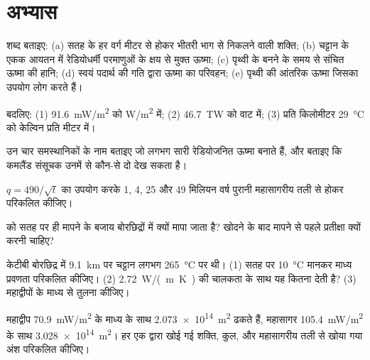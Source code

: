 \section{अभ्यास}

\begin{exercise}[$\star$]\label{exo:g12:internal-heat:1}
शब्द बताइए: (a) सतह के हर वर्ग मीटर से होकर भीतरी भाग से निकलने वाली
शक्ति; (b) चट्टान के एकक आयतन में रेडियोधर्मी परमाणुओं के क्षय से मुक्त
ऊष्मा; (c) पृथ्वी के बनने के समय से संचित ऊष्मा की हानि;
(d) स्वयं पदार्थ की गति द्वारा ऊष्मा का परिवहन; (e) पृथ्वी की
आंतरिक ऊष्मा जिसका उपयोग लोग करते हैं।
\end{exercise}

\begin{exercise}[$\star$]\label{exo:g12:internal-heat:2}
बदलिए: (1) \qty{91.6}{mW/m^2} को \unit{W/m^2} में; (2) \qty{46.7}{TW} को
वाट में; (3) प्रति किलोमीटर \qty{29}{\celsius} को केल्विन प्रति मीटर में।
\end{exercise}

\begin{exercise}[$\star$]\label{exo:g12:internal-heat:3}
उन चार समस्थानिकों के नाम बताइए जो लगभग सारी रेडियोजनित ऊष्मा बनाते हैं, और बताइए कि
कमलैंड संसूचक उनमें से कौन-से दो देख सकता है।
\end{exercise}

\begin{exercise}[$\star$]\label{exo:g12:internal-heat:4}
$q = 490/\sqrt{t}$ का उपयोग करके 1, 4,
25 और 49 मिलियन वर्ष पुरानी महासागरीय तली से होकर  परिकलित कीजिए।
\end{exercise}

\begin{exercise}[$\star$]\label{exo:g12:internal-heat:5}
 को सतह पर ही मापने के बजाय बोरछिद्रों में क्यों मापा जाता है?
खोदने के बाद मापने से पहले प्रतीक्षा क्यों करनी चाहिए?
\end{exercise}

\begin{exercise}[$\star\star$]\label{exo:g12:internal-heat:6}
केटीबी बोरछिद्र में \qty{9.1}{km} पर चट्टान लगभग \qty{265}{\celsius} पर
थी। (1) सतह पर \qty{10}{\celsius} मानकर माध्य
प्रवणता परिकलित कीजिए। (2) \qty{2.72}{W/(m.K)} की चालकता के साथ यह कितना 
देती है? (3) महाद्वीपों के माध्य से तुलना कीजिए।
\end{exercise}

\begin{exercise}[$\star\star$]\label{exo:g12:internal-heat:7}
महाद्वीप \qty{70.9}{mW/m^2} के माध्य  के साथ \qty{2.073e14}{m^2} ढकते हैं,
महासागर \qty{105.4}{mW/m^2} के साथ \qty{3.028e14}{m^2}। हर एक द्वारा खोई गई शक्ति,
कुल, और महासागरीय तली से खोया गया
अंश परिकलित कीजिए।
\end{exercise}

